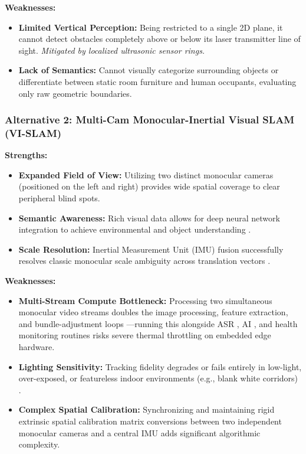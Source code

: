 \documentclass[12pt,a4paper]{report}
\begin{document}
\textbf{Weaknesses:}
\begin{itemize}[leftmargin=*,itemsep=2pt]
    \item \textbf{Limited Vertical Perception:} Being restricted to a single 2D plane, it cannot detect obstacles completely above or below its laser transmitter line of sight. \textit{Mitigated by localized ultrasonic sensor rings.}
    \item \textbf{Lack of Semantics:} Cannot visually categorize surrounding objects or differentiate between static room furniture and human occupants, evaluating only raw geometric boundaries.
\end{itemize}

\subsubsection{Alternative 2: Multi-Cam Monocular-Inertial Visual SLAM (VI-SLAM)}

\textbf{Strengths:}
\begin{itemize}[leftmargin=*,itemsep=2pt]
    \item \textbf{Expanded Field of View:} Utilizing two distinct monocular cameras (positioned on the left and right) provides wide spatial coverage to clear peripheral blind spots.
    \item \textbf{Semantic Awareness:} Rich visual data allows for deep neural network integration to achieve environmental and object understanding \cite{elalfy_monocular}.
    \item \textbf{Scale Resolution:} Inertial Measurement Unit (IMU) fusion successfully resolves classic monocular scale ambiguity across translation vectors \cite{orbslam3}.
\end{itemize}

\textbf{Weaknesses:}
\begin{itemize}[leftmargin=*,itemsep=2pt]
    \item \textbf{Multi-Stream Compute Bottleneck:} Processing two simultaneous monocular video streams doubles the image processing, feature extraction, and bundle-adjustment loops \cite{orbslam3}—running this alongside ASR , AI \cite{llama}, and health monitoring routines \cite{hou_2024,sonekar_2024} risks severe thermal throttling on embedded edge hardware.
    \item \textbf{Lighting Sensitivity:} Tracking fidelity degrades or fails entirely in low-light, over-exposed, or featureless indoor environments (e.g., blank white corridors) \cite{elalfy_monocular}.
    \item \textbf{Complex Spatial Calibration:} Synchronizing and maintaining rigid extrinsic spatial calibration matrix conversions between two independent monocular cameras and a central IMU adds significant algorithmic complexity.
\end{itemize}
\end{document}
